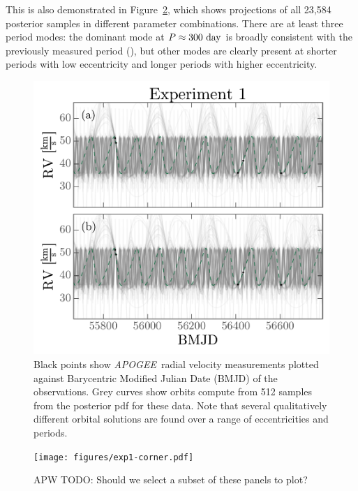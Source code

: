 \documentclass[manuscript, letterpaper]{aastex6}
\newcommand{\project}[1]{\textsl{#1}}
\newcommand{\acronym}[1]{{\small{#1}}}
\newcommand{\apogee}{\project{\acronym{APOGEE}}}
\newcommand{\figname}{Figure}
\newcommand{\todoapw}[1]{{\color{red}APW TODO: #1}}
\begin{document}
This is also demonstrated in \figname~\ref{fig:exp1-corner}, which shows
projections of all 23,584 posterior samples in different parameter
combinations.
There are at least three period modes: the dominant mode at $P \approx 300~{\rm
day}$ is broadly consistent with the previously measured period
(\citealt{Troup:2016}), but other modes are clearly present at shorter periods
with low eccentricity and longer periods with higher eccentricity.

\begin{figure}[p]
\begin{center}
\includegraphics[width=\textwidth]{figures/exp1-rv-curves.pdf}
\end{center}
\caption{%
Black points show \apogee\ radial velocity measurements plotted against
Barycentric Modified Julian Date (BMJD) of the observations.
Grey curves show orbits compute from 512 samples from the posterior pdf for
these data.
Note that several qualitatively different orbital solutions are found over a
range of eccentricities and periods.
\label{fig:exp1-rv}}
\end{figure}

\begin{figure}[p]
\begin{center}
\texttt{[image: figures/exp1-corner.pdf]}
\end{center}
\caption{%
\todoapw{Should we select a subset of these panels to plot?}
\label{fig:exp1-corner}}
\end{figure}
\end{document}
